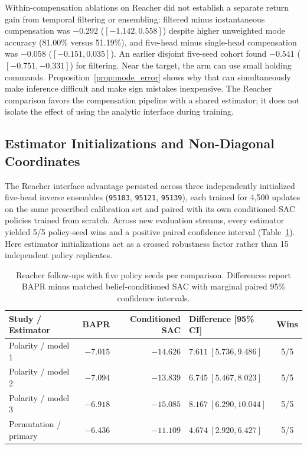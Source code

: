 \documentclass[twoside,11pt]{article}
\begin{document}
Within-compensation ablations on Reacher did not establish a separate return gain from temporal filtering or ensembling: filtered minus instantaneous compensation was $-0.292$ ($[-1.142,0.558]$) despite higher unweighted mode accuracy (81.00\% versus 51.19\%), and five-head minus single-head compensation was $-0.058$ ($[-0.151,0.035]$). An earlier disjoint five-seed cohort found $-0.541$ ($[-0.751,-0.331]$) for filtering. Near the target, the arm can use small holding commands. Proposition~\ref{prop:mode_error} shows why that can simultaneously make inference difficult and make sign mistakes inexpensive. The Reacher comparison favors the compensation pipeline with a shared estimator; it does not isolate the effect of using the analytic interface during training.

\FloatBarrier
\subsection{Estimator Initializations and Non-Diagonal Coordinates}
\label{sec:coordinate_extension}

The Reacher interface advantage persisted across three independently initialized five-head inverse ensembles (\texttt{95103}, \texttt{95121}, \texttt{95139}), each trained for 4,500 updates on the same prescribed calibration set and paired with its own conditioned-SAC policies trained from scratch. Across new evaluation streams, every estimator yielded 5/5 policy-seed wins and a positive paired confidence interval (Table~\ref{tab:coordinate_extension}). Here estimator initializations act as a crossed robustness factor rather than 15 independent policy replicates.

\begin{table}[ht]
\centering
\small
\setlength{\tabcolsep}{4pt}
\caption{Reacher follow-ups with five policy seeds per comparison. Differences report BAPR minus matched belief-conditioned SAC with marginal paired 95\% confidence intervals.}
\label{tab:coordinate_extension}
\begin{tabular}{lrrlc}
\toprule
Study / Estimator & BAPR & Conditioned SAC & Difference [95\% CI] & Wins \\
\midrule
Polarity / model 1 & $-7.015$ & $-14.626$ & $7.611\ [5.736,9.486]$ & 5/5 \\
Polarity / model 2 & $-7.094$ & $-13.839$ & $6.745\ [5.467,8.023]$ & 5/5 \\
Polarity / model 3 & $-6.918$ & $-15.085$ & $8.167\ [6.290,10.044]$ & 5/5 \\
Permutation / primary & $-6.436$ & $-11.109$ & $4.674\ [2.920,6.427]$ & 5/5 \\
\bottomrule
\end{tabular}
\end{table}
\end{document}
